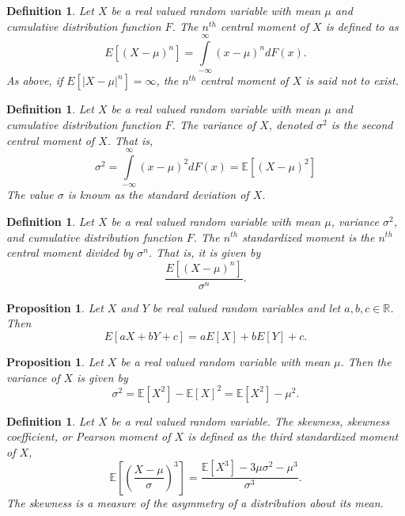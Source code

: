 \documentclass[1pt]{report}
\newtheorem{prop}[thm]{Proposition}
\newtheorem{defn}[thm]{Definition}
\newcommand{\Rone}{\mathbb{R}}
\newcommand{\R}{\Rone}
\newcommand{\<}{\langle}
\renewcommand{\>}{\rangle}
\newcommand{\E}{\mathbb{E}}
\begin{document}
\begin{defn}\label{def:centralmoment}
Let $X$ be a real valued random variable with mean $\mu$ and cumulative distribution function $F$. The $n^{th}$ \emph{central moment} of $X$ is defined to as
$$E[(X-\mu)^n] = \int\limits_{-\infty}^\infty  (x-\mu)^n dF(x).$$
As above, if $E[|X-\mu|^n] = \infty$, the $n^{th}$ central moment of $X$ is said not to exist.
\end{defn}
\begin{defn}\label{def:variance}
Let $X$ be a real valued random variable with mean $\mu$ and cumulative distribution function $F$. The \emph{variance} of $X$, denoted $\sigma^2$ is the second central moment of $X$. That is,
$$ \sigma^2 = \int\limits_{-\infty}^\infty (x-\mu)^2 dF(x) = \E[(X-\mu)^2]$$
The value $\sigma$ is known as the \emph{standard deviation} of $X$.
\end{defn}
\begin{defn}\label{def:standardizedmoment}
Let $X$ be a real valued random variable with mean $\mu$, variance $\sigma^2$, and cumulative distribution function $F$. The $n^{th}$ \emph{standardized moment} is the $n^{th}$ central moment divided by $\sigma^n$. That is, it is given by
$$\frac{E[(X-\mu)^n]}{\sigma^n}.$$
\end{defn}
\begin{prop}\label{prop:expectationalgebra}
Let $X$ and $Y$ be real valued random variables and let $a, b, c \in \R$. Then
$$E[aX + bY + c] = aE[X] + bE[Y] + c.$$
\end{prop}
\begin{prop}\label{prop:calculatevariance}
Let $X$ be a real valued random variable with mean $\mu$. Then the variance of $X$ is given by 
$$\sigma^2 = \E[X^2] - \E[X]^2 = \E[X^2] - \mu^2.$$
\end{prop}
\begin{defn}\label{def:skewness}
Let $X$ be a real valued random variable. The \emph{skewness}, \emph{skewness coefficient}, or \emph{Pearson moment} of $X$ is defined as the third standardized moment of $X$,
$$\E\left[\left(\frac{X-\mu}{\sigma}\right)^3\right] = \frac{\E[X^3] - 3\mu \sigma^2 - \mu^3}{\sigma^3}.$$
The skewness is a measure of the asymmetry of a distribution about its mean.
\end{defn}
\end{document}
